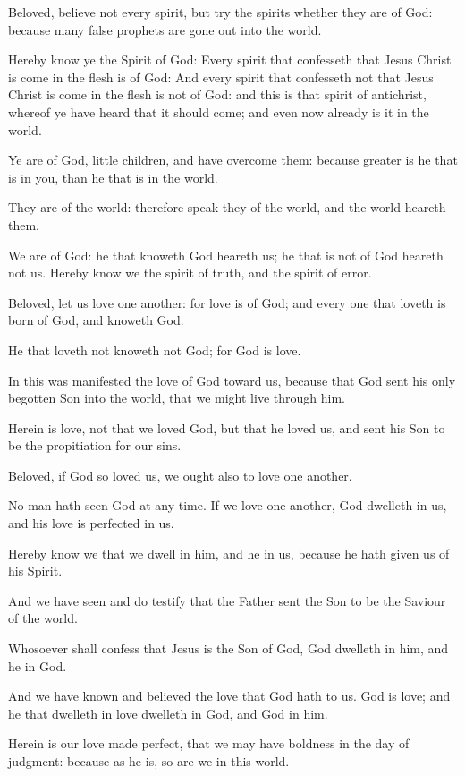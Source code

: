 \Chapter
\Verse Beloved, believe not every spirit, but try the spirits whether they are of God: because many false prophets are gone out into the world.

\Verse Hereby know ye the Spirit of God: Every spirit that confesseth that Jesus Christ is come in the flesh is of God: \Verse And every spirit that confesseth not that Jesus Christ is come in the flesh is not of God: and this is that spirit of antichrist, whereof ye have heard that it should come; and even now already is it in the world.

\Verse Ye are of God, little children, and have overcome them: because greater is he that is in you, than he that is in the world.

\Verse They are of the world: therefore speak they of the world, and the world heareth them.

\Verse We are of God: he that knoweth God heareth us; he that is not of God heareth not us. Hereby know we the spirit of truth, and the spirit of error.

\Verse Beloved, let us love one another: for love is of God; and every one that loveth is born of God, and knoweth God.

\Verse He that loveth not knoweth not God; for God is love.

\Verse In this was manifested the love of God toward us, because that God sent his only begotten Son into the world, that we might live through him.

\Verse Herein is love, not that we loved God, but that he loved us, and sent his Son to be the propitiation for our sins.

\Verse Beloved, if God so loved us, we ought also to love one another.

\Verse No man hath seen God at any time. If we love one another, God dwelleth in us, and his love is perfected in us.

\Verse Hereby know we that we dwell in him, and he in us, because he hath given us of his Spirit.

\Verse And we have seen and do testify that the Father sent the Son to be the Saviour of the world.

\Verse Whosoever shall confess that Jesus is the Son of God, God dwelleth in him, and he in God.

\Verse And we have known and believed the love that God hath to us. God is love; and he that dwelleth in love dwelleth in God, and God in him.

\Verse Herein is our love made perfect, that we may have boldness in the day of judgment: because as he is, so are we in this world.

